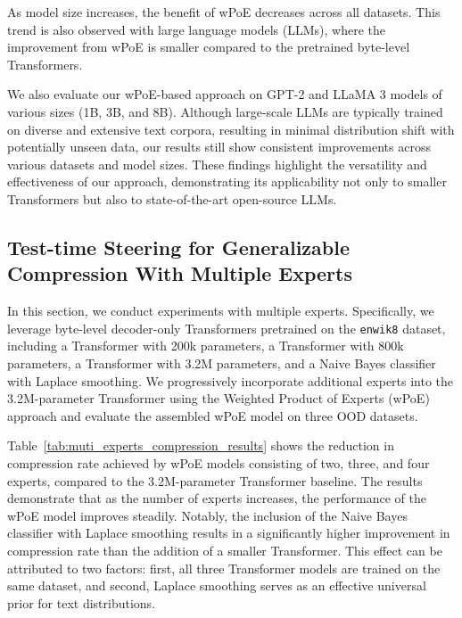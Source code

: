 \documentclass[11pt]{article}
\begin{document}
As model size increases, the benefit of wPoE decreases across all datasets. 
This trend is also observed with large language models (LLMs), where the improvement from wPoE is smaller compared to the pretrained byte-level Transformers.

We also evaluate our wPoE-based approach on GPT-2 and LLaMA 3 models of various sizes (1B, 3B, and 8B). 
Although large-scale LLMs are typically trained on diverse and extensive text corpora, resulting in minimal distribution shift with potentially unseen data, our results still show consistent improvements across various datasets and model sizes.
These findings highlight the versatility and effectiveness of our approach, demonstrating its applicability not only to smaller Transformers but also to state-of-the-art open-source LLMs.

\subsection{Test-time Steering for Generalizable Compression With Multiple Experts}
In this section, we conduct experiments with multiple experts. 
Specifically, we leverage byte-level decoder-only Transformers pretrained on the \texttt{enwik8} dataset, including a Transformer with 200k parameters, a Transformer with 800k parameters, a Transformer with 3.2M parameters, and a Naive Bayes classifier with Laplace smoothing. 
We progressively incorporate additional experts into the 3.2M-parameter Transformer using the Weighted Product of Experts (wPoE) approach and evaluate the assembled wPoE model on three OOD datasets.

Table~\ref{tab:muti_experts_compression_results} shows the reduction in compression rate achieved by wPoE models consisting of two, three, and four experts, compared to the 3.2M-parameter Transformer baseline. 
The results demonstrate that as the number of experts increases, the performance of the wPoE model improves steadily. 
Notably, the inclusion of the Naive Bayes classifier with Laplace smoothing results in a significantly higher improvement in compression rate than the addition of a smaller Transformer. 
This effect can be attributed to two factors: first, all three Transformer models are trained on the same dataset, and second, Laplace smoothing serves as an effective universal prior for text distributions.
\end{document}
